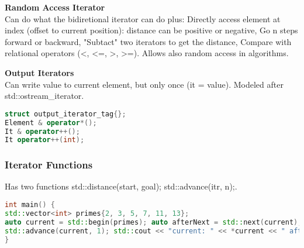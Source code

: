 \textbf{Random Access Iterator} \\
Can do what the bidiretional iterator can do plus: Directly access element at index (offset to current position): distance can be positive or negative, Go n steps forward or backward, "Subtact" two iterators to get the distance, Compare with relational operators (<, <=, >, >=).
 Allows also random access in algorithms.

\textbf{Output Iterators} \\
 Can write value to current element, but only once (\*it = value).  Modeled after std::ostream\_iterator. 

\begin{lstlisting}[language=C++]
struct output_iterator_tag{};
Element & operator*(); 
It & operator++(); 
It operator++(int);
\end{lstlisting}

\subsubsection{Iterator Functions}
Has two functions std::distance(start, goal); std::advance(itr, n);.

\begin{lstlisting}[language=C++]
int main() {
std::vector<int> primes{2, 3, 5, 7, 11, 13};
auto current = std::begin(primes); auto afterNext = std::next(current); std::cout << "current: " << *current << " afterNext: " << *afterNext << '\n';
std::advance(current, 1); std::cout << "current: " << *current << " afterNext: " << *afterNext << '\n';
}
\end{lstlisting}


\pagebreak
